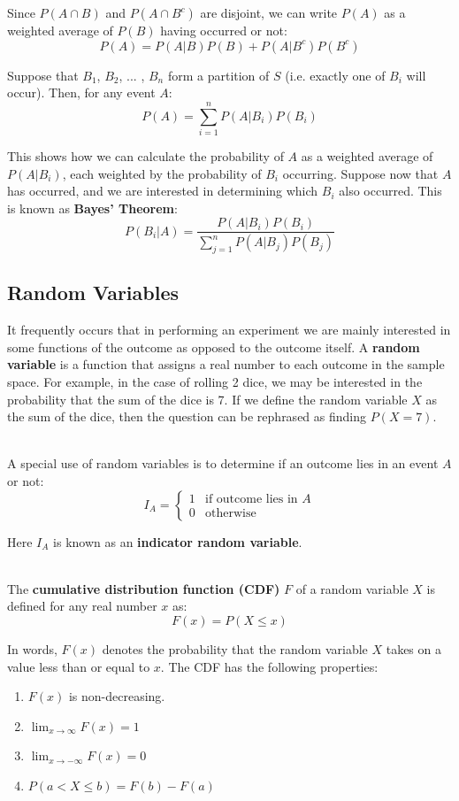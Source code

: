 \documentclass[12pt]{article}
\begin{document}
\noindent
Since $P(A \cap B)$ and $P(A \cap B^c)$ are disjoint, we can write $P(A)$ as a weighted average of $P(B)$ having occurred or not:
\[ P(A) = P(A|B)P(B) + P(A|B^c)P(B^c) \]

\newpage
\noindent
Suppose that $B_1$, $B_2$, ... , $B_n$ form a partition of $S$ (i.e. exactly one of $B_i$ will occur).
Then, for any event $A$:
\[ P(A) = \sum_{i=1}^n P(A|B_i)P(B_i) \]

\noindent
This shows how we can calculate the probability of $A$ as a weighted average of $P(A|B_i)$, each weighted by the probability of $B_i$ occurring.
Suppose now that $A$ has occurred, and we are interested in determining which $B_i$ also occurred.
This is known as \textbf{Bayes' Theorem}:
\[ P(B_i | A) = \frac{P(A | B_i)P(B_i)}{\sum_{j = 1}^{n}P(A | B_j)P(B_j)} \]

\subsection{Random Variables}
It frequently occurs that in performing an experiment we are mainly interested in some functions of the outcome as opposed to the outcome itself.
A \textbf{random variable} is a function that assigns a real number to each outcome in the sample space.
For example, in the case of rolling 2 dice, we may be interested in the probability that the sum of the dice is 7.
If we define the random variable $X$ as the sum of the dice, then the question can be rephrased as finding $P(X = 7)$.

\noindent
\\
A special use of random variables is to determine if an outcome lies in an event $A$ or not:
\[ I_A = \begin{cases}
    1 & \text{if outcome lies in } A \\
    0 & \text{otherwise}
\end{cases} \]

\noindent
Here $I_A$ is known as an \textbf{indicator random variable}.

\noindent
\\
The \textbf{cumulative distribution function (CDF)} $F$ of a random variable $X$ is defined for any real number $x$ as:
\[ F(x) = P(X \leq x) \]

\noindent
In words, $F(x)$ denotes the probability that the random variable $X$ takes on a value less than or equal to $x$.
The CDF has the following properties:

\begin{enumerate}
    \item $F(x)$ is non-decreasing.
    \item $\lim_{x \to \infty} F(x) = 1$
    \item $\lim_{x \to -\infty} F(x) = 0$
    \item $P(a < X \leq b) = F(b) - F(a)$
\end{enumerate}
\end{document}
